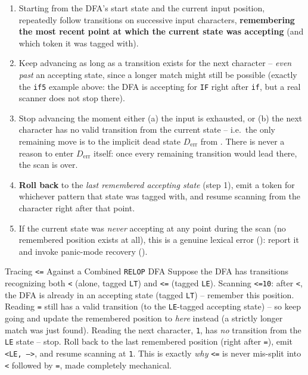 \documentclass[full-course-notes.tex]{subfiles}
\begin{document}
\begin{coreidea}
\begin{enumerate}
  \item Starting from the DFA's start state and the current input position, repeatedly follow
  transitions on successive input characters, \textbf{remembering the most recent point at
  which the current state was accepting} (and which token it was tagged with).
  \item Keep advancing as long as a transition exists for the next character -- \emph{even past}
  an accepting state, since a longer match might still be possible (exactly the \texttt{if5}
  example above: the DFA is accepting for \texttt{IF} right after \texttt{if}, but a real
  scanner does not stop there).
  \item Stop advancing the moment either (a) the input is exhausted, or (b) the next character
  has no valid transition from the current state -- i.e.\ the only remaining move is to the
  implicit dead state $D_{\text{err}}$ from . There is never a reason
  to enter $D_{\text{err}}$ itself: once every remaining transition would lead there, the scan
  is over.
  \item \textbf{Roll back} to the \emph{last remembered accepting state} (step 1), emit a token
  for whichever pattern that state was tagged with, and resume scanning from the character right
  after that point.
  \item If the current state was \emph{never} accepting at any point during the scan (no
  remembered position exists at all), this is a genuine lexical error
  (): report it and invoke panic-mode recovery
  ().
\end{enumerate}
\end{coreidea}

\begin{examplebox}{Tracing \texttt{<=} Against a Combined \texttt{RELOP} DFA}
Suppose the DFA has transitions recognizing both \texttt{<} (alone, tagged \texttt{LT}) and
\texttt{<=} (tagged \texttt{LE}). Scanning \texttt{<=10}: after \texttt{<}, the DFA is already
in an accepting state (tagged \texttt{LT}) -- remember this position. Reading \texttt{=} still
has a valid transition (to the \texttt{LE}-tagged accepting state) -- so keep going and update
the remembered position to \emph{here} instead (a strictly longer match was just found). Reading
the next character, \texttt{1}, has \emph{no} transition from the \texttt{LE} state -- stop.
Roll back to the last remembered position (right after \texttt{=}), emit \texttt{<LE, -->}, and
resume scanning at \texttt{1}. This is exactly \emph{why} \texttt{<=} is never mis-split into
\texttt{<} followed by \texttt{=}, made completely mechanical.
\end{examplebox}
\end{document}
